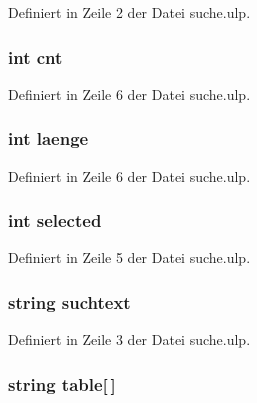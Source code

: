 Definiert in Zeile 2 der Datei suche.\+ulp.

\hypertarget{suche_8ulp_a9cfbb269728dc4185236d28be58d9eab}{}
\subsubsection[{cnt}]{\setlength{\rightskip}{0pt plus 5cm}int cnt}\label{suche_8ulp_a9cfbb269728dc4185236d28be58d9eab}


Definiert in Zeile 6 der Datei suche.\+ulp.

\hypertarget{suche_8ulp_a5094b708df9b2d68a8bc53f236aa0a0e}{}
\subsubsection[{laenge}]{\setlength{\rightskip}{0pt plus 5cm}int laenge}\label{suche_8ulp_a5094b708df9b2d68a8bc53f236aa0a0e}


Definiert in Zeile 6 der Datei suche.\+ulp.

\hypertarget{suche_8ulp_adab4da51ba40d5a492becdceccccbfcd}{}
\subsubsection[{selected}]{\setlength{\rightskip}{0pt plus 5cm}int selected}\label{suche_8ulp_adab4da51ba40d5a492becdceccccbfcd}


Definiert in Zeile 5 der Datei suche.\+ulp.

\hypertarget{suche_8ulp_aecdc9611136768cc5b5f6d17bf551706}{}
\subsubsection[{suchtext}]{\setlength{\rightskip}{0pt plus 5cm}string suchtext}\label{suche_8ulp_aecdc9611136768cc5b5f6d17bf551706}


Definiert in Zeile 3 der Datei suche.\+ulp.

\hypertarget{suche_8ulp_af47537269e0310e36e1939d5c06b4880}{}
\subsubsection[{table}]{\setlength{\rightskip}{0pt plus 5cm}string table\mbox{[}$\,$\mbox{]}}\label{suche_8ulp_af47537269e0310e36e1939d5c06b4880}



